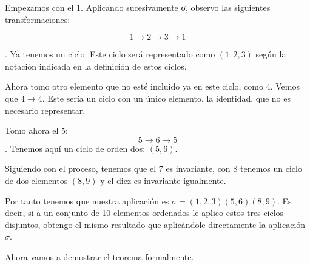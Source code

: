 \documentclass[nochap]{apuntes}
\begin{document}
 Empezamos con el 1. Aplicando sucesivamente σ, observo las siguientes transformaciones:

 \[ 1 \to 2 \to 3 \to 1 \]

 . Ya tenemos un ciclo. Este ciclo será representado como $(1,2,3)$ según la notación indicada en la definición de estos ciclos.

 Ahora tomo otro elemento que no esté incluido ya en este ciclo, como 4. Vemos que $4 \to 4$. Este sería un ciclo con un único elemento, la identidad, que no es necesario representar.

 Tomo ahora el $5$: \[5 \to  6 \to 5 \]. Tenemos aquí un ciclo de orden dos: $(5,6)$.

 Siguiendo con el proceso, tenemos que el 7 es invariante, con $8$ tenemos un ciclo de dos elementos $(8,9)$ y el diez es invariante igualmente.

 Por tanto tenemos que nuestra aplicación es $\sigma = (1,2,3)(5,6)(8,9)$. Es decir, si a un conjunto de 10 elementos ordenados le aplico estos tres ciclos disjuntos, obtengo el mismo resultado que aplicándole directamente la aplicación $\sigma$.

Ahora vamos a demostrar el teorema formalmente.
\end{document}
